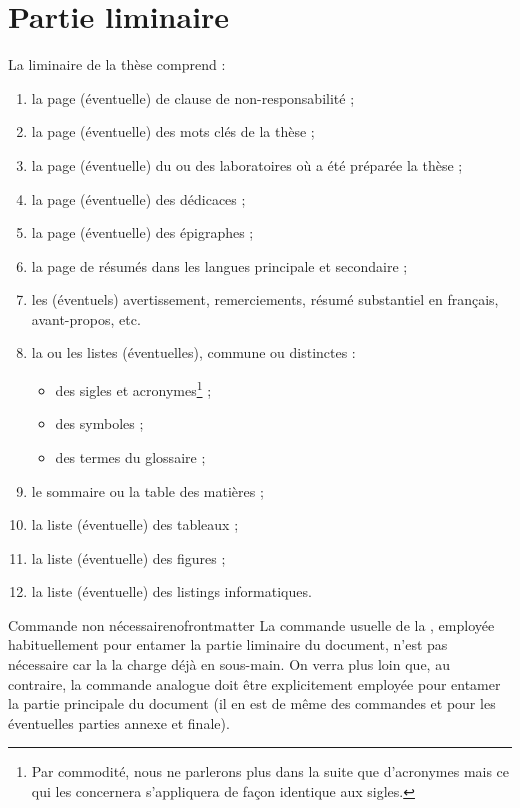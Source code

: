 \chapter{Partie liminaire}\label{cha-liminaires}
%
%
%

La \gls{liminaire} de la thèse comprend :
\begin{enumerate}
\item la page (éventuelle) de clause de non-responsabilité ;
\item la page (éventuelle) des mots clés de la thèse ;
\item la page (éventuelle) du ou des laboratoires où a été préparée la thèse ;
\item la page (éventuelle) des dédicaces ;
\item la page (éventuelle) des épigraphes ;
\item la page de résumés dans les langues principale et secondaire ;
\item les (éventuels) avertissement, remerciements, résumé substantiel en
  français, avant-propos, etc.
\item la ou les listes (éventuelles), commune ou distinctes :
  \begin{itemize}
  \item des sigles et acronymes\footnote{Par commodité, nous ne parlerons plus
      dans la suite que d'acronymes mais ce qui les concernera s'appliquera de
      façon identique aux sigles.} ;
  \item des symboles ;
  \item des termes du glossaire ;
  \end{itemize}
\item le sommaire ou la table des matières ;
\item la liste (éventuelle) des tableaux ;
\item la liste (éventuelle) des figures ;
\item la liste (éventuelle) des listings informatiques.
\end{enumerate}

\begin{dbremark}{Commande \protect{} non nécessaire}{nofrontmatter}
  La commande  usuelle de la , employée
  habituellement pour entamer la partie liminaire du document, n'est pas
  nécessaire car la \yatCl{} la charge déjà en sous-main. On verra plus loin
  que, au contraire, la commande analogue  doit être
  explicitement employée pour entamer la partie principale du document (il en
  est de même des commandes  et  pour les
  éventuelles parties annexe et finale).
\end{dbremark}

